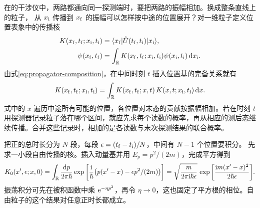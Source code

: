 \label{ss:qm-path-integral}

在的干涉仪中，两路都通向同一探测端时，要把两路的振幅相加。换成整条直线上的粒子，
从 $x_\mathrm i$ 传播到 $x_\mathrm f$ 的振幅可以怎样按中途的位置展开？对一维粒子定义位置表象中的传播核
\begin{subequations}\label{eq:qm-position-kernel}
    \begin{align}
        K(x_\mathrm f,t_\mathrm f;x_\mathrm i,t_\mathrm i) &= \langle x_\mathrm f\vert\hat{U}(t_\mathrm f,t_\mathrm i)\vert x_\mathrm i\rangle,\\
        \psi(x_\mathrm f,t_\mathrm f) &= \int_{\mathbb{R}} K(x_\mathrm f,t_\mathrm f;x_\mathrm i,t_\mathrm i)\psi(x_\mathrm i,t_\mathrm i)\mathop{}\!\mathrm{d} x_\mathrm i .
    \end{align}
\end{subequations}
由式\eqref{eq:propagator-composition}，在中间时刻 $t$ 插入位置基的完备关系就有
\begin{equation}\label{eq:qm-kernel-composition}
    K(x_\mathrm f,t_\mathrm f;x_\mathrm i,t_\mathrm i) = \int_{\mathbb{R}} K(x_\mathrm f,t_\mathrm f;x,t)\,K(x,t;x_\mathrm i,t_\mathrm i)\mathop{}\!\mathrm{d} x .
\end{equation}
式中的 $x$ 遍历中途所有可能的位置，各位置对末态的贡献按振幅相加。若在时刻 $t$ 用探测器记录粒子落在哪个区间，就应先求每个读数的概率，再从相应的测后态继续传播。合并这些记录时，相加的是各读数与末次探测结果的联合概率。

把正的总时长分为 $N$ 段，每段 $\epsilon = (t_\mathrm f - t_\mathrm i)/N$，中间有 $N - 1$ 个位置要积分。
先求一小段自由传播的核。插入动量基并用 $E_p = p^2/(2m)$，完成平方得到
\begin{equation}
    K_0(x',\epsilon;x,0)
    = \int_{\mathbb{R}}\frac{\mathop{}\!\mathrm{d} p}{2\pi\hbar}
       \exp\bigg[\frac{\mathrm{i}}{\hbar}\bigl(p(x' - x) - \epsilon p^2/(2m)\bigr)\bigg]
    = \sqrt{\frac{m}{2\pi\mathrm{i}\hbar\epsilon}}\,
       \exp\bigg[\frac{\mathrm{i} m(x' - x)^2}{2\hbar\epsilon}\bigg].
    \label{eq:qm-free-kernel}
\end{equation}
振荡积分可先在被积函数中乘 $\mathop{}\!\mathrm{e}^{-\eta p^2}$，再令 $\eta\to0$，这也固定了平方根的相位。自由粒子的这个结果对任意正时长都成立。

